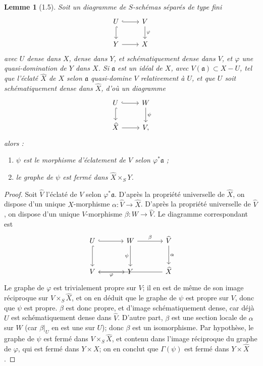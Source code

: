 \documentclass[11pt]{article}
\newtheorem*{lemma}{Lemme}
\newcommand{\wh}[1]{\widehat{#1}}
\begin{document}
\begin{lemma}[1.5]
Soit un diagramme de \(S\)-schémas séparés de type fini
\[
\begin{tikzcd}
U \ar[r,hook] \ar[d,hook] & V \ar[d,"\varphi"] \\
Y \ar[r] & X
\end{tikzcd}
\]
avec \(U\) dense dans \(X\), dense dans \(Y\), et schématiquement dense dans \(V\), et \(\varphi\) une quasi-domination de \(Y\) dans \(X\). Si \(\mathfrak a\) est un idéal de \(X\), avec \(V(\mathfrak a)\subset X-U\), tel que l'éclaté \(\wh X\) de \(X\) selon \(\mathfrak a\) quasi-domine \(V\) relativement à \(U\), et que \(U\) soit schématiquement dense dans \(\wh X\), d'où un diagramme
\[
\begin{tikzcd}
U \ar[r,hook] \ar[d,hook] & W \ar[d,"\psi"] \\
\wh X \ar[r] & V,
\end{tikzcd}
\]
alors :
\begin{enumerate}[label=(\alph*)]
\item \(\psi\) est le morphisme d'éclatement de \(V\) selon \(\varphi^*\mathfrak a\) ;
\item le graphe de \(\psi\) est fermé dans \(\wh X\times_S Y\).
\end{enumerate}
\end{lemma}

\begin{proof}
Soit \(\wh V\) l'éclaté de \(V\) selon \(\varphi^*\mathfrak a\). D'après la propriété universelle de \(\wh X\), on dispose d'un unique \(X\)-morphisme \(\alpha:\wh V\to\wh X\). D'après la propriété universelle de \(\wh V\), on dispose d'un unique \(V\)-morphisme \(\beta:W\to\wh V\). Le diagramme correspondant est
\[
\begin{tikzcd}[column sep=large,row sep=large]
U \ar[r,hook] \ar[d,hook] & W \ar[r,"\beta"] \ar[d,"\psi"'] & \wh V \ar[d,"\alpha"] \\
V \ar[r,"\varphi"'] & Y & \wh X \ar[ll]
\end{tikzcd}
\]
Le graphe de \(\varphi\) est trivialement propre sur \(V\); il en est de même de son image réciproque sur \(V\times_S\wh X\), et on en déduit que le graphe de \(\psi\) est propre sur \(V\), donc que \(\psi\) est propre. \(\beta\) est donc propre, et d'image schématiquement dense, car déjà \(U\) est schématiquement dense dans \(\wh V\). D'autre part, \(\beta\) est une section locale de \(\alpha\) sur \(W\) (car \(\beta|_U\) en est une sur \(U\)); donc \(\beta\) est un isomorphisme. Par hypothèse, le graphe de \(\psi\) est fermé dans \(V\times_S\wh X\), et contenu dans l'image réciproque du graphe de \(\varphi\), qui est fermé dans \(Y\times X\); on en conclut que \(\Gamma(\psi)\) est fermé dans \(Y\times\wh X\).
\end{proof}
\end{document}
